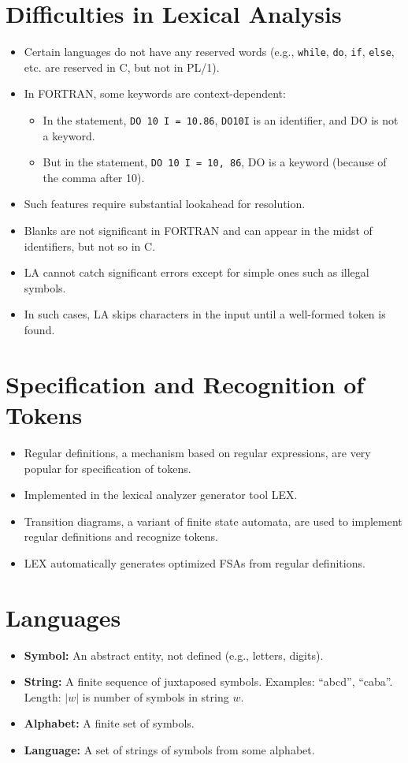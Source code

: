 \documentclass[12pt,a4paper]{article}
\begin{document}
\section{Difficulties in Lexical Analysis}
\begin{itemize}
    \item Certain languages do not have any reserved words (e.g., \texttt{while}, \texttt{do}, \texttt{if}, \texttt{else}, etc. are reserved in C, but not in PL/1).
    \item In FORTRAN, some keywords are context-dependent:
    \begin{itemize}
        \item In the statement, \texttt{DO 10 I = 10.86}, \texttt{DO10I} is an identifier, and DO is not a keyword.
        \item But in the statement, \texttt{DO 10 I = 10, 86}, DO is a keyword (because of the comma after 10).
    \end{itemize}
    \item Such features require substantial lookahead for resolution.
    \item Blanks are not significant in FORTRAN and can appear in the midst of identifiers, but not so in C.
    \item LA cannot catch significant errors except for simple ones such as illegal symbols.
    \item In such cases, LA skips characters in the input until a well-formed token is found.
\end{itemize}

\section{Specification and Recognition of Tokens}
\begin{itemize}
    \item Regular definitions, a mechanism based on regular expressions, are very popular for specification of tokens.
    \item Implemented in the lexical analyzer generator tool LEX.
    \item Transition diagrams, a variant of finite state automata, are used to implement regular definitions and recognize tokens.
    \item LEX automatically generates optimized FSAs from regular definitions.
\end{itemize}

\section{Languages}
\begin{itemize}
    \item \textbf{Symbol:} An abstract entity, not defined (e.g., letters, digits).
    \item \textbf{String:} A finite sequence of juxtaposed symbols. Examples: ``abcd'', ``caba''. Length: $|w|$ is number of symbols in string $w$.
    \item \textbf{Alphabet:} A finite set of symbols.
    \item \textbf{Language:} A set of strings of symbols from some alphabet.
\end{itemize}
\end{document}
